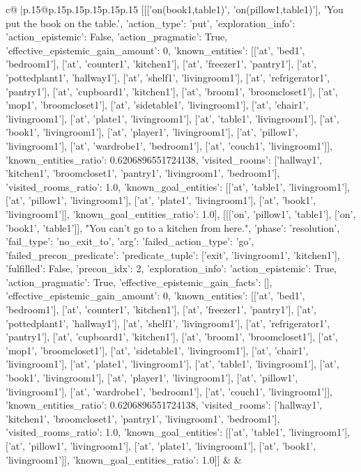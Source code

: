 \documentclass{article}
\begin{document}
{\begin{supertabular}{c@{$\;$}|p{.15\linewidth}@{}p{.15\linewidth}p{.15\linewidth}p{.15\linewidth}p{.15\linewidth}p{.15\linewidth}}
{{{	 [[['on(book1,table1)', 'on(pillow1,table1)'], 'You put the book on the table.', {'action_type': 'put', 'exploration_info': {'action_epistemic': False, 'action_pragmatic': True, 'effective_epistemic_gain_amount': 0, 'known_entities': [['at', 'bed1', 'bedroom1'], ['at', 'counter1', 'kitchen1'], ['at', 'freezer1', 'pantry1'], ['at', 'pottedplant1', 'hallway1'], ['at', 'shelf1', 'livingroom1'], ['at', 'refrigerator1', 'pantry1'], ['at', 'cupboard1', 'kitchen1'], ['at', 'broom1', 'broomcloset1'], ['at', 'mop1', 'broomcloset1'], ['at', 'sidetable1', 'livingroom1'], ['at', 'chair1', 'livingroom1'], ['at', 'plate1', 'livingroom1'], ['at', 'table1', 'livingroom1'], ['at', 'book1', 'livingroom1'], ['at', 'player1', 'livingroom1'], ['at', 'pillow1', 'livingroom1'], ['at', 'wardrobe1', 'bedroom1'], ['at', 'couch1', 'livingroom1']], 'known_entities_ratio': 0.6206896551724138, 'visited_rooms': ['hallway1', 'kitchen1', 'broomcloset1', 'pantry1', 'livingroom1', 'bedroom1'], 'visited_rooms_ratio': 1.0, 'known_goal_entities': [['at', 'table1', 'livingroom1'], ['at', 'pillow1', 'livingroom1'], ['at', 'plate1', 'livingroom1'], ['at', 'book1', 'livingroom1']], 'known_goal_entities_ratio': 1.0}}], [[['on', 'pillow1', 'table1'], ['on', 'book1', 'table1']], "You can't go to a kitchen from here.", {'phase': 'resolution', 'fail_type': 'no_exit_to', 'arg': {'failed_action_type': 'go', 'failed_precon_predicate': {'predicate_tuple': ['exit', 'livingroom1', 'kitchen1'], 'fulfilled': False, 'precon_idx': 2}}, 'exploration_info': {'action_epistemic': True, 'action_pragmatic': True, 'effective_epistemic_gain_facts': [], 'effective_epistemic_gain_amount': 0, 'known_entities': [['at', 'bed1', 'bedroom1'], ['at', 'counter1', 'kitchen1'], ['at', 'freezer1', 'pantry1'], ['at', 'pottedplant1', 'hallway1'], ['at', 'shelf1', 'livingroom1'], ['at', 'refrigerator1', 'pantry1'], ['at', 'cupboard1', 'kitchen1'], ['at', 'broom1', 'broomcloset1'], ['at', 'mop1', 'broomcloset1'], ['at', 'sidetable1', 'livingroom1'], ['at', 'chair1', 'livingroom1'], ['at', 'plate1', 'livingroom1'], ['at', 'table1', 'livingroom1'], ['at', 'book1', 'livingroom1'], ['at', 'player1', 'livingroom1'], ['at', 'pillow1', 'livingroom1'], ['at', 'wardrobe1', 'bedroom1'], ['at', 'couch1', 'livingroom1']], 'known_entities_ratio': 0.6206896551724138, 'visited_rooms': ['hallway1', 'kitchen1', 'broomcloset1', 'pantry1', 'livingroom1', 'bedroom1'], 'visited_rooms_ratio': 1.0, 'known_goal_entities': [['at', 'table1', 'livingroom1'], ['at', 'pillow1', 'livingroom1'], ['at', 'plate1', 'livingroom1'], ['at', 'book1', 'livingroom1']], 'known_goal_entities_ratio': 1.0}}]] 
	  } 
	   } 
	   } 
	 & & \\ 
 


\end{supertabular}}
\end{document}
